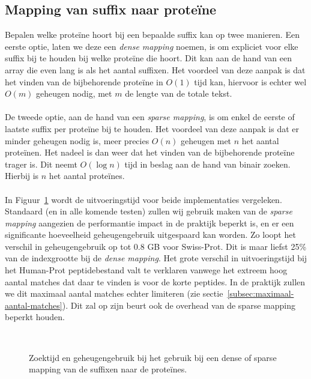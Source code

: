 \subsection{Mapping van suffix naar proteïne}\label{subsec:mapping-van-suffix-naar-proteine}
Bepalen welke proteïne hoort bij een bepaalde suffix kan op twee manieren.
Een eerste optie, laten we deze een \textit{dense mapping} noemen, is om expliciet voor elke suffix bij te houden bij welke proteïne die hoort.
Dit kan aan de hand van een array die even lang is als het aantal suffixen.
Het voordeel van deze aanpak is dat het vinden van de bijbehorende proteïne in $O(1)$ tijd kan, hiervoor is echter wel $O(m)$ geheugen nodig, met $m$ de lengte van de totale tekst.
\\ \\
De tweede optie, aan de hand van een \textit{sparse mapping}, is om enkel de eerste of laatste suffix per proteïne bij te houden.
Het voordeel van deze aanpak is dat er minder geheugen nodig is, meer precies $O(n)$ geheugen met $n$ het aantal proteïnen.
Het nadeel is dan weer dat het vinden van de bijbehorende proteïne trager is.
Dit neemt $O(\log n)$ tijd in beslag aan de hand van binair zoeken.
Hierbij is $n$ het aantal proteïnes.
\\ \\
In Figuur~\ref{fig:dense_vs_sparse} wordt de uitvoeringstijd voor beide implementaties vergeleken.
Standaard (en in alle komende testen) zullen wij gebruik maken van de \textit{sparse mapping} aangezien de performantie impact in de praktijk beperkt is, en er een significante hoeveelheid geheugengebruik uitgespaard kan worden.
Zo loopt het verschil in geheugengebruik op tot 0.8 GB voor Swiss-Prot.
Dit is maar liefst 25\% van de indexgrootte bij de \textit{dense mapping}.
Het grote verschil in uitvoeringstijd bij het Human-Prot peptidebestand valt te verklaren vanwege het extreem hoog aantal matches dat daar te vinden is voor de korte peptides.
In de praktijk zullen we dit maximaal aantal matches echter limiteren (zie sectie~\ref{subsec:maximaal-aantal-matches}).
Dit zal op zijn beurt ook de overhead van de sparse mapping beperkt houden.
\begin{figure}[H]
    \centering
    \\[4ex] %

    \caption{Zoektijd en geheugengebruik bij het gebruik bij een dense of sparse mapping van de suffixen naar de proteïnes.}\label{fig:dense_vs_sparse}
\end{figure}

